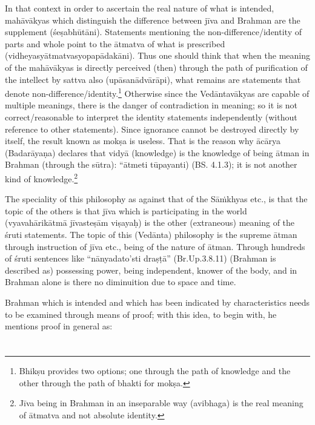 In that context in order to ascertain the real nature of what is intended, mahāvākyas which distinguish the difference between jīva and Brahman are the supplement (śeṣabhūtāni). Statements mentioning the non-difference/identity of parts and whole point to the ātmatva of what is prescribed (vidheyasyātmatvasyopapādakāni). Thus one should think that when the meaning of the mahāvākyas is directly perceived (then) through the path of purification of the intellect by sattva also (upāsanādvārāpi),  what remains are statements that denote non-difference/identity.\footnote{Bhikṣu provides two options; one through the path of knowledge and the other through the path of bhakti for mokṣa.} Otherwise since the Vedāntavākyas are capable of multiple meanings, there is the danger of contradiction in meaning; so it is not correct/reasonable to interpret the identity statements independently (without reference to other statements). Since ignorance cannot be destroyed directly by itself, the result known as mokṣa is useless. That is the reason why ācārya (Badarāyaṇa) declares that vidyā (knowledge) is the knowledge of being ātman in Brahman (through the sūtra): “ātmeti tūpayanti) (BS. 4.1.3); it is not another kind of knowledge.\footnote{Jīva being in Brahman in an inseparable way (avibhaga) is the real meaning of ātmatva and not absolute
identity.} 

The speciality of this philosophy as against that of the Sāṁkhyas etc., is that the topic of the others is that jīva which is participating in the world (vyavahārikātmā jīvasteṣām viṣayaḥ) is the other (extraneous) meaning of the śruti statements. The topic of this (Vedānta) philosophy is the supreme ātman through instruction of jīva etc., being of the nature of ātman. Through hundreds of śruti sentences like “nānyadato’sti draṣṭā” (Br.Up.3.8.11) (Brahman is described as) possessing power, being independent, knower of the body, and in Brahman alone is there no diminuition due to space and time.

Brahman which is intended and which has been indicated by characteristics needs to be examined through means of proof; with this idea, to begin with, he mentions proof in general as:

\section*{}

